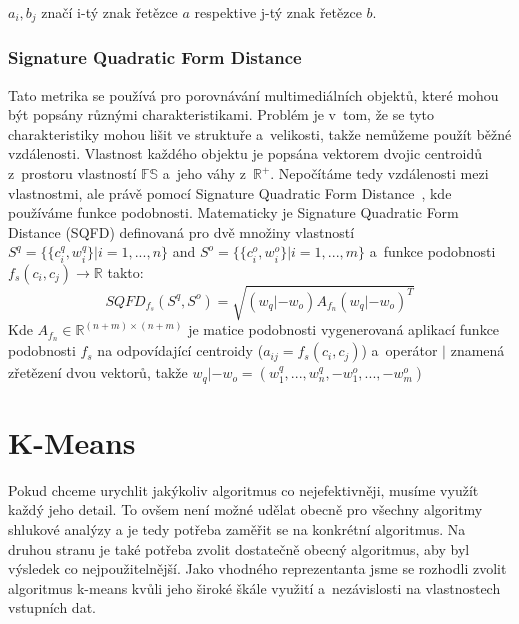 $a_i, b_j$ značí i-tý znak řetězce $a$ respektive j-tý znak řetězce $b$.

\subsubsection{Signature Quadratic Form Distance}
Tato metrika se používá pro porovnávání multimediálních objektů, které mohou být popsány různými charakteristikami. Problém je v~tom, že se tyto charakteristiky mohou lišit ve struktuře a~velikosti, takže nemůžeme použít běžné vzdálenosti. Vlastnost každého objektu je popsána vektorem dvojic centroidů z~prostoru vlastností $\mathbb{FS}$ a~jeho váhy z~$\mathbb{R^{+}}$.
Nepočítáme tedy vzdálenosti mezi vlastnostmi, ale právě pomocí Signature Quadratic Form Distance~\cite{Beecks10}, kde používáme funkce podobnosti.
Matematicky je Signature Quadratic Form Distance (SQFD) definovaná pro dvě množiny vlastností $S^{q} = \{\{c_i^q, w_i^q\}|i=1,...,n\}$ and $S^{o} = \{\{c_i^o, w_i^o\}|i=1,...,m\}$ a~funkce podobnosti $f_s(c_i, c_j)\to \mathbb{R}$ takto:
$$SQFD_{f_s}(S^q,S^o)=\sqrt{(w_q|-w_o)A_{f_n}(w_q|-w_o)^T}$$
Kde $A_{f_n} \in \mathbb{R}^{(n+m)\times(n+m)}$ je matice podobnosti vygenerovaná aplikací funkce podobnosti $f_s$ na odpovídající centroidy  ($a_{ij}=f_s(c_i,c_j)$) a~operátor $|$ znamená zřetězení dvou vektorů, takže $w_q|-w_o = (w_1^q,...,w_n^q,-w_1^o,...,-w_m^o)$\\

\section{K-Means}
Pokud chceme urychlit jakýkoliv algoritmus co nejefektivněji, musíme využít každý jeho detail. To ovšem není možné udělat obecně pro všechny algoritmy shlukové analýzy a je tedy potřeba zaměřit se na konkrétní algoritmus. Na druhou stranu je také potřeba zvolit dostatečně obecný algoritmus, aby byl výsledek co nejpoužitelnější. Jako vhodného reprezentanta jsme se rozhodli zvolit algoritmus k-means kvůli jeho široké škále využití a~nezávislosti na vlastnostech vstupních dat. \\

